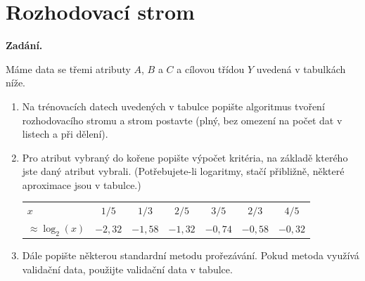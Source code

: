 \section{Rozhodovací strom}

\noindent\textbf{Zadání.}\par
Máme data se třemi atributy $A$, $B$ a $C$ a cílovou třídou $Y$ uvedená v tabulkách níže.

\begin{enumerate}
  \item Na trénovacích datech uvedených v tabulce popište algoritmus tvoření rozhodovacího stromu
    a strom postavte (plný, bez omezení na počet dat v listech a při dělení).
  \item Pro atribut vybraný do kořene popište výpočet kritéria, na základě kterého jste daný atribut
    vybrali. (Potřebujete-li logaritmy, stačí přibližně, některé aproximace jsou v tabulce.)
    \begin{center}
    \begin{tabular}{lcccccc}
    \toprule
    $x$ & $1/5$ & $1/3$ & $2/5$ & $3/5$ & $2/3$ & $4/5$ \\
    $\approx \log_2(x)$ & $-2{,}32$ & $-1{,}58$ & $-1{,}32$ & $-0{,}74$ & $-0{,}58$ & $-0{,}32$ \\
    \bottomrule
    \end{tabular}
    \end{center}
  \item Dále popište některou standardní metodu prořezávání. Pokud metoda využívá validační data,
    použijte validační data v tabulce.
\end{enumerate}

